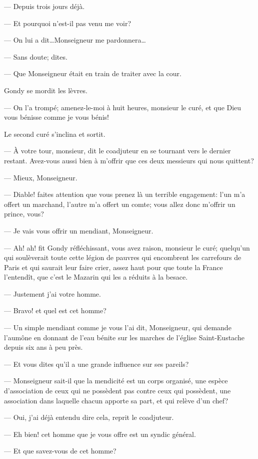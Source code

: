 — Depuis trois jours déjà.

— Et pourquoi n'est-il pas venu me voir?

— On lui a dit\dots Monseigneur me pardonnera\dots

— Sans doute; dites.

— Que Monseigneur était en train de traiter avec la cour.

Gondy se mordit les lèvres.

— On l'a trompé; amenez-le-moi à huit heures, monsieur le curé, et que Dieu vous bénisse comme je vous bénis!

Le second curé s'inclina et sortit.

— À votre tour, monsieur, dit le coadjuteur en se tournant vers le dernier restant. Avez-vous aussi bien à m'offrir que ces deux messieurs qui nous quittent?

— Mieux, Monseigneur.

— Diable! faites attention que vous prenez là un terrible engagement: l'un m'a offert un marchand, l'autre m'a offert un comte; vous allez donc m'offrir un prince, vous?

— Je vais vous offrir un mendiant, Monseigneur.

— Ah! ah! fit Gondy réfléchissant, vous avez raison, monsieur le curé; quelqu'un qui soulèverait toute cette légion de pauvres qui encombrent les carrefours de Paris et qui saurait leur faire crier, assez haut pour que toute la France l'entendît, que c'est le Mazarin qui les a réduits à la besace.

— Justement j'ai votre homme.

— Bravo! et quel est cet homme?

— Un simple mendiant comme je vous l'ai dit, Monseigneur, qui demande l'aumône en donnant de l'eau bénite sur les marches de l'église Saint-Eustache depuis six ans à peu près.

— Et vous dites qu'il a une grande influence sur ses pareils?

— Monseigneur sait-il que la mendicité est un corps organisé, une espèce d'association de ceux qui ne possèdent pas contre ceux qui possèdent, une association dans laquelle chacun apporte sa part, et qui relève d'un chef?

— Oui, j'ai déjà entendu dire cela, reprit le coadjuteur.

— Eh bien! cet homme que je vous offre est un syndic général.

— Et que savez-vous de cet homme?

